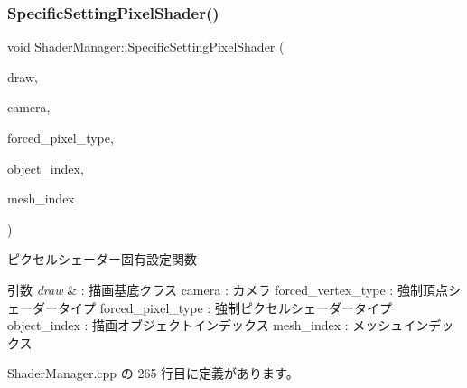 \subsubsection{\texorpdfstring{Specific\+Setting\+Pixel\+Shader()}{SpecificSettingPixelShader()}}
{\footnotesize\ttfamily void Shader\+Manager\+::\+Specific\+Setting\+Pixel\+Shader (\begin{DoxyParamCaption}\item[{\mbox{\hyperlink{class_draw_base}{Draw\+Base}} $\ast$}]{draw,  }\item[{\mbox{\hyperlink{class_camera}{Camera}} $\ast$}]{camera,  }\item[{\mbox{\hyperlink{class_shader_manager_a7d15d773b3c6a99dd7086c45c8b0be5f}{Pixel\+Shader\+Type}}}]{forced\+\_\+pixel\+\_\+type,  }\item[{unsigned}]{object\+\_\+index,  }\item[{unsigned}]{mesh\+\_\+index }\end{DoxyParamCaption})\hspace{0.3cm}{\ttfamily [private]}}



ピクセルシェーダー固有設定関数 


\begin{DoxyParams}{引数}
{\em draw} & \+: 描画基底クラス camera \+: カメラ forced\+\_\+vertex\+\_\+type \+: 強制頂点シェーダータイプ forced\+\_\+pixel\+\_\+type \+: 強制ピクセルシェーダータイプ object\+\_\+index \+: 描画オブジェクトインデックス mesh\+\_\+index \+: メッシュインデックス \\
\hline
\end{DoxyParams}


 Shader\+Manager.\+cpp の 265 行目に定義があります。

